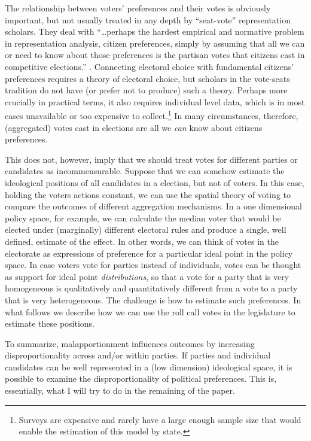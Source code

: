 The relationship between voters' preferences and their votes is obviously important, but not usually treated in any depth by ``seat-vote'' representation scholars. They deal with ``\ldots perhaps the hardest empirical and normative problem in representation analysis, citizen preferences, simply by assuming that all we can or need to know about those preferences is the partisan votes that citizens cast in competitive elections.'' \citep[][p.274-275]{powell:2004}. Connecting electoral choice with fundamental citizens' preferences requires a theory of electoral choice, but scholars in the vote-seats tradition do not have (or prefer not to produce) such a theory. Perhaps more crucially in practical terms, it also requires individual level data, which is in most cases unavailable or too expensive to collect.\footnote{Surveys are expensive and rarely have a large enough sample size that would enable the estimation of this model by state. }  In many circumstances, therefore, (aggregated) votes cast in elections are all we \emph{can} know about citizens preferences. 

This does not, however, imply that we should treat votes for different parties or candidates as incommensurable. Suppose that we can somehow estimate the ideological positions of all candidates in a election, but not of voters. In this case, holding the voters actions constant, we can use the spatial theory of voting to compare the outcomes of different aggregation mechanisms. In a one dimensional policy space, for example, we can calculate the median voter that would be elected under (marginally) different electoral rules and produce a single, well defined, estimate of the effect. In other words, we can think of votes in the electorate as expressions of preference for a particular ideal point in the policy space. In case voters vote for parties instead of individuals, votes can be thought as support for ideal point \emph{distributions}, so that a vote for a party that is very homogeneous is qualitatively and quantitatively different from a vote to a party that is very heterogeneous. The challenge is how to estimate such preferences. In what follows we describe how we can use the roll call votes in the legislature to estimate these positions.

To summarize, malapportionment influences outcomes by increasing disproportionality across and/or within parties. If parties and individual candidates can be well represented in a (low dimension) ideological space, it is possible to examine the disproportionality of political preferences. This is, essentially, what I will try to do in the remaining of the paper.  

